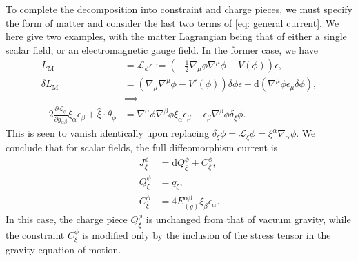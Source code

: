 \documentclass[]{jkpaper}
\theoremstyle{plain}
\theoremstyle{definition}
\newcommand{\sd}{\mathrm {d}}
\def\extd{\mathrm {d}}
\newcommand{\fd}{\delta}
\newcommand{\sL}{\mathcal{L}}
\begin{document}
To complete the decomposition into constraint and charge pieces, we must specify the form of matter and consider the last two terms of \eqref{eq: general current}. We here give two examples, with the matter Lagrangian being that of either a single scalar field, or an electromagnetic gauge field.  In the former case, we have
\begin{equation}\begin{split}
L_{\text{M}}&=\mathcal{L}_\phi\epsilon:= \left(-\frac{1}{2}\nabla_\mu \phi \nabla^\mu\phi-V(\phi)\right)\epsilon,\\
\fd L_{\text{M}}&=\left(\nabla_\mu\nabla^\mu\phi-V'(\phi)\right)\fd\phi\epsilon - \sd(\nabla^\mu\phi\epsilon_\mu \fd\phi),\\
&\implies\\
-2\frac{\partial \mathcal{L}_\phi}{\partial g_{\alpha\beta}}\xi_\alpha\epsilon_\beta
+\hat{\xi}\cdot\theta_\phi
&=\nabla^\alpha \phi \nabla^\beta \phi\xi_\alpha\epsilon_\beta
-\epsilon_\beta\nabla^\beta\phi \delta_\xi \phi.
\end{split}\end{equation}
This is seen to vanish identically upon replacing $\delta_\xi\phi = \sL_\xi\phi=\xi^\alpha\nabla_\alpha \phi$.
We conclude that for scalar fields, the full diffeomorphism current is
\begin{equation}\begin{split}\label{eq:resultsScalar}
 J^{\phi}_\xi &= \extd Q^{\phi}_\xi + C^{\phi}_\xi,\\
 Q^{\phi}_\xi &= q_\xi,\\
 C^{\phi}_\xi &= 4 E^{\alpha\beta}_{(g)}\xi_\beta \epsilon_\alpha .
\end{split}\end{equation}
In this case, the charge piece $Q^\phi_\xi$ is unchanged from that of vacuum gravity, while the constraint $C_\xi^\phi$ is modified only by the inclusion of the stress tensor in the gravity equation of motion.
\end{document}
